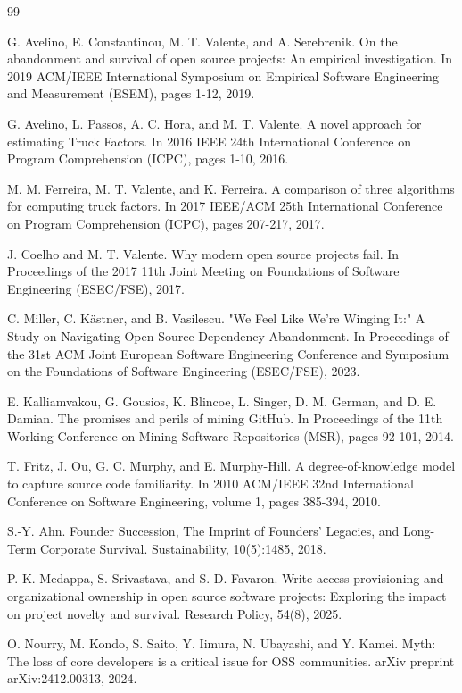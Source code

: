 \documentclass[11pt,letterpaper]{article}
\begin{document}
\begin{thebibliography}{99}

 G. Avelino, E. Constantinou, M. T. Valente, and A. Serebrenik. On the abandonment and survival of open source projects: An empirical investigation. In 2019 ACM/IEEE International Symposium on Empirical Software Engineering and Measurement (ESEM), pages 1-12, 2019.

 G. Avelino, L. Passos, A. C. Hora, and M. T. Valente. A novel approach for estimating Truck Factors. In 2016 IEEE 24th International Conference on Program Comprehension (ICPC), pages 1-10, 2016.

 M. M. Ferreira, M. T. Valente, and K. Ferreira. A comparison of three algorithms for computing truck factors. In 2017 IEEE/ACM 25th International Conference on Program Comprehension (ICPC), pages 207-217, 2017.

 J. Coelho and M. T. Valente. Why modern open source projects fail. In Proceedings of the 2017 11th Joint Meeting on Foundations of Software Engineering (ESEC/FSE), 2017.

 C. Miller, C. Kästner, and B. Vasilescu. "We Feel Like We're Winging It:" A Study on Navigating Open-Source Dependency Abandonment. In Proceedings of the 31st ACM Joint European Software Engineering Conference and Symposium on the Foundations of Software Engineering (ESEC/FSE), 2023.

 E. Kalliamvakou, G. Gousios, K. Blincoe, L. Singer, D. M. German, and D. E. Damian. The promises and perils of mining GitHub. In Proceedings of the 11th Working Conference on Mining Software Repositories (MSR), pages 92-101, 2014.

 T. Fritz, J. Ou, G. C. Murphy, and E. Murphy-Hill. A degree-of-knowledge model to capture source code familiarity. In 2010 ACM/IEEE 32nd International Conference on Software Engineering, volume 1, pages 385-394, 2010.

 S.-Y. Ahn. Founder Succession, The Imprint of Founders' Legacies, and Long-Term Corporate Survival. Sustainability, 10(5):1485, 2018.

 P. K. Medappa, S. Srivastava, and S. D. Favaron. Write access provisioning and organizational ownership in open source software projects: Exploring the impact on project novelty and survival. Research Policy, 54(8), 2025.

 O. Nourry, M. Kondo, S. Saito, Y. Iimura, N. Ubayashi, and Y. Kamei. Myth: The loss of core developers is a critical issue for OSS communities. arXiv preprint arXiv:2412.00313, 2024.


\end{thebibliography}
\end{document}
